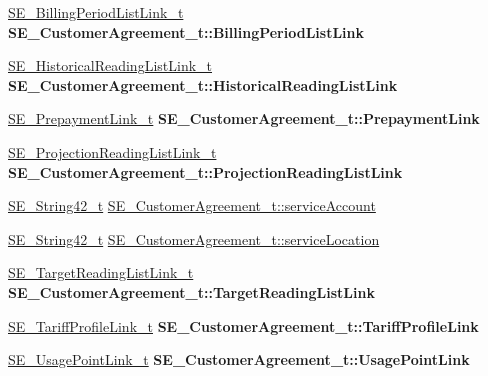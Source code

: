 \begin{DoxyCompactItemize}
\item 
\mbox{\label{group__CustomerAgreement_ga3e17a342e6e9e4fec87e35045dddfb5b}} 
\hyperlink{structSE__BillingPeriodListLink__t}{S\+E\+\_\+\+Billing\+Period\+List\+Link\+\_\+t} {\bfseries S\+E\+\_\+\+Customer\+Agreement\+\_\+t\+::\+Billing\+Period\+List\+Link}
\item 
\mbox{\label{group__CustomerAgreement_ga755ba53d4140ee50ecd0376dc674761a}} 
\hyperlink{structSE__HistoricalReadingListLink__t}{S\+E\+\_\+\+Historical\+Reading\+List\+Link\+\_\+t} {\bfseries S\+E\+\_\+\+Customer\+Agreement\+\_\+t\+::\+Historical\+Reading\+List\+Link}
\item 
\mbox{\label{group__CustomerAgreement_ga49c9823615c8b5bf7dc016530744e00e}} 
\hyperlink{structSE__PrepaymentLink__t}{S\+E\+\_\+\+Prepayment\+Link\+\_\+t} {\bfseries S\+E\+\_\+\+Customer\+Agreement\+\_\+t\+::\+Prepayment\+Link}
\item 
\mbox{\label{group__CustomerAgreement_ga0d42e0600fb8afd8bbc2e641a6b8c9ed}} 
\hyperlink{structSE__ProjectionReadingListLink__t}{S\+E\+\_\+\+Projection\+Reading\+List\+Link\+\_\+t} {\bfseries S\+E\+\_\+\+Customer\+Agreement\+\_\+t\+::\+Projection\+Reading\+List\+Link}
\item 
\hyperlink{group__String42_gad5a294b994fa3a024ca6d747f784f0d9}{S\+E\+\_\+\+String42\+\_\+t} \hyperlink{group__CustomerAgreement_ga697dece44e28455e87d8bab8035f602f}{S\+E\+\_\+\+Customer\+Agreement\+\_\+t\+::service\+Account}
\item 
\hyperlink{group__String42_gad5a294b994fa3a024ca6d747f784f0d9}{S\+E\+\_\+\+String42\+\_\+t} \hyperlink{group__CustomerAgreement_ga8215bbc6ed1bacb861e7b4aacb3cd931}{S\+E\+\_\+\+Customer\+Agreement\+\_\+t\+::service\+Location}
\item 
\mbox{\label{group__CustomerAgreement_ga19525e594bce34a02e46a15e16088edc}} 
\hyperlink{structSE__TargetReadingListLink__t}{S\+E\+\_\+\+Target\+Reading\+List\+Link\+\_\+t} {\bfseries S\+E\+\_\+\+Customer\+Agreement\+\_\+t\+::\+Target\+Reading\+List\+Link}
\item 
\mbox{\label{group__CustomerAgreement_gaf013ebd77bb5ef62228fc8cab2671f88}} 
\hyperlink{structSE__TariffProfileLink__t}{S\+E\+\_\+\+Tariff\+Profile\+Link\+\_\+t} {\bfseries S\+E\+\_\+\+Customer\+Agreement\+\_\+t\+::\+Tariff\+Profile\+Link}
\item 
\mbox{\label{group__CustomerAgreement_gae89f392a5bf23cbf71eccd81bb927933}} 
\hyperlink{structSE__UsagePointLink__t}{S\+E\+\_\+\+Usage\+Point\+Link\+\_\+t} {\bfseries S\+E\+\_\+\+Customer\+Agreement\+\_\+t\+::\+Usage\+Point\+Link}
\end{DoxyCompactItemize}


